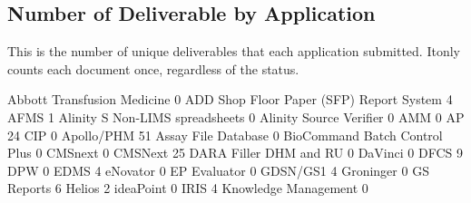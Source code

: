 \documentclass{article}
\begin{document}
\subsection{Number of Deliverable by Application}
This is the number of unique deliverables that each application submitted. Itonly counts
each document once, regardless of the status.
\begin{Schunk}
\begin{Soutput}
             Abbott Transfusion Medicine 
                                       0 
ADD Shop Floor Paper (SFP) Report System 
                                       4 
                                    AFMS 
                                       1 
         Alinity S Non-LIMS spreadsheets 
                                       0 
                 Alinity Source Verifier 
                                       0 
                                     AMM 
                                       0 
                               AP 24 CIP 
                                       0 
                              Apollo/PHM 
                                      51 
                     Assay File Database 
                                       0 
           BioCommand Batch Control Plus 
                                       0 
                                 CMSnext 
                                       0 
                                 CMSNext 
                                      25 
                  DARA Filler DHM and RU 
                                       0 
                                 DaVinci 
                                       0 
                                    DFCS 
                                       9 
                                     DPW 
                                       0 
                                    EDMS 
                                       4 
                                eNovator 
                                       0 
                            EP Evaluator 
                                       0 
                                GDSN/GS1 
                                       4 
                               Groninger 
                                       0 
                              GS Reports 
                                       6 
                                  Helios 
                                       2 
                               ideaPoint 
                                       0 
                                    IRIS 
                                       4 
                    Knowledge Management 
                                       0 

\end{Soutput}
\end{Schunk}
\end{document}
